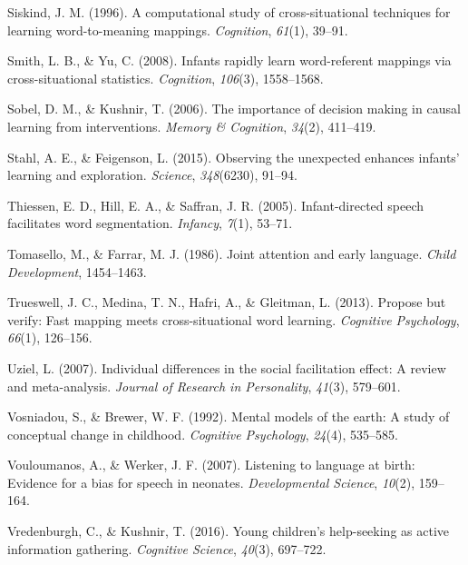 \documentclass[english,floatsintext,man]{apa6}
\theoremstyle{definition}
\theoremstyle{definition}
\theoremstyle{definition}
\theoremstyle{remark}
\begin{document}
\hypertarget{ref-siskind1996computational}{}
Siskind, J. M. (1996). A computational study of cross-situational
techniques for learning word-to-meaning mappings. \emph{Cognition},
\emph{61}(1), 39--91.

\hypertarget{ref-smith2008infants}{}
Smith, L. B., \& Yu, C. (2008). Infants rapidly learn word-referent
mappings via cross-situational statistics. \emph{Cognition},
\emph{106}(3), 1558--1568.

\hypertarget{ref-sobel2006importance}{}
Sobel, D. M., \& Kushnir, T. (2006). The importance of decision making
in causal learning from interventions. \emph{Memory \& Cognition},
\emph{34}(2), 411--419.

\hypertarget{ref-stahl2015observing}{}
Stahl, A. E., \& Feigenson, L. (2015). Observing the unexpected enhances
infants' learning and exploration. \emph{Science}, \emph{348}(6230),
91--94.

\hypertarget{ref-thiessen2005infant}{}
Thiessen, E. D., Hill, E. A., \& Saffran, J. R. (2005). Infant-directed
speech facilitates word segmentation. \emph{Infancy}, \emph{7}(1),
53--71.

\hypertarget{ref-tomasello1986joint}{}
Tomasello, M., \& Farrar, M. J. (1986). Joint attention and early
language. \emph{Child Development}, 1454--1463.

\hypertarget{ref-trueswell2013propose}{}
Trueswell, J. C., Medina, T. N., Hafri, A., \& Gleitman, L. (2013).
Propose but verify: Fast mapping meets cross-situational word learning.
\emph{Cognitive Psychology}, \emph{66}(1), 126--156.

\hypertarget{ref-uziel2007individual}{}
Uziel, L. (2007). Individual differences in the social facilitation
effect: A review and meta-analysis. \emph{Journal of Research in
Personality}, \emph{41}(3), 579--601.

\hypertarget{ref-vosniadou1992mental}{}
Vosniadou, S., \& Brewer, W. F. (1992). Mental models of the earth: A
study of conceptual change in childhood. \emph{Cognitive Psychology},
\emph{24}(4), 535--585.

\hypertarget{ref-vouloumanos2007listening}{}
Vouloumanos, A., \& Werker, J. F. (2007). Listening to language at
birth: Evidence for a bias for speech in neonates. \emph{Developmental
Science}, \emph{10}(2), 159--164.

\hypertarget{ref-vredenburgh2016young}{}
Vredenburgh, C., \& Kushnir, T. (2016). Young children's help-seeking as
active information gathering. \emph{Cognitive Science}, \emph{40}(3),
697--722.
\end{document}
